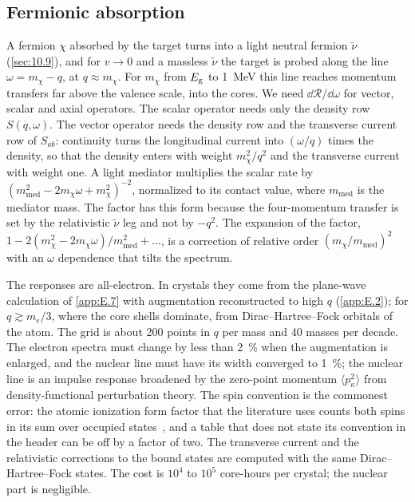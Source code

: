 \subsection{Fermionic absorption}

A fermion $\chi$ absorbed by the target turns into a light neutral fermion $\tilde\nu$ (\cref{sec:10.9}), and for $v \to 0$ and a massless $\tilde\nu$ the target is probed along the line $\omega = m_\chi - q$, at $q \approx m_\chi$. For $m_\chi$ from $E_{\mathrm{g}}$ to \SI{1}{MeV} this line reaches momentum transfers far above the valence scale, into the cores. We need $\dd\mathcal{R}/\dd\omega$ for vector, scalar and axial operators. The scalar operator needs only the density row $S(q, \omega)$. The vector operator needs the density row and the transverse current row of $S_{ab}$: continuity turns the longitudinal current into $(\omega/q)$ times the density, so that the density enters with weight $m_\chi^2/q^2$ and the transverse current with weight one. A light mediator multiplies the scalar rate by $(m_{\mathrm{med}}^2 - 2m_\chi\omega + m_\chi^2)^{-2}$, normalized to its contact value, where $m_{\mathrm{med}}$ is the mediator mass. The factor has this form because the four-momentum transfer is set by the relativistic $\tilde\nu$ leg and not by $-q^2$. The expansion of the factor, $1 - 2(m_\chi^2 - 2m_\chi\omega)/m_{\mathrm{med}}^2 + \dots$, is a correction of relative order $(m_\chi/m_{\mathrm{med}})^2$ with an $\omega$ dependence that tilts the spectrum.

The responses are all-electron. In crystals they come from the plane-wave calculation of \cref{app:E.7} with augmentation reconstructed to high $q$ (\cref{app:E.2}); for $q \gtrsim m_e/3$, where the core shells dominate, from Dirac--Hartree--Fock orbitals of the atom. The grid is about 200 points in $q$ per mass and 40 masses per decade. The electron spectra must change by less than \SI{2}{\percent} when the augmentation is enlarged, and the nuclear line must have its width converged to \SI{1}{\percent}; the nuclear line is an impulse response broadened by the zero-point momentum $\langle p_\kappa^2\rangle$ from density-functional perturbation theory. The spin convention is the commonest error: the atomic ionization form factor that the literature uses counts both spins in its sum over occupied states~\cite[Eqs.~(A.18)--(A.21)]{essig2016direct}, and a table that does not state its convention in the header can be off by a factor of two. The transverse current and the relativistic corrections to the bound states are computed with the same Dirac--Hartree--Fock states. The cost is $10^{4}$ to $10^{5}$ core-hours per crystal; the nuclear part is negligible.

